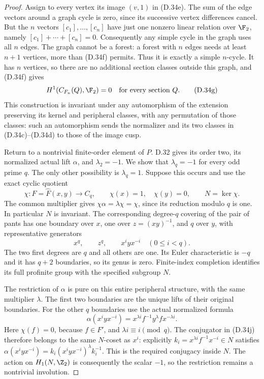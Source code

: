 \begin{proof}
Assign to every vertex its image $(v,1)$ in (D.34e).
The sum of the edge vectors around a graph cycle is zero,
since its successive vertex differences cancel.  But the
$n$ vectors $[c_1],\ldots,[c_n]$ have just one nonzero
linear relation over $\F_2$, namely
$[c_1]+\cdots+[c_n]=0$.  Consequently any simple cycle
in the graph uses all $n$ edges.  The graph cannot be a
forest: a forest with $n$ edges needs at least $n+1$
vertices, more than (D.34f) permits.  Thus it is exactly
a simple $n$-cycle.  It has $n$ vertices, so there are
no additional section classes outside this graph, and
(D.34f) gives
\[
            H^1(C_{F_n}(Q),\F_2)=0
                   \quad\text{for every section }Q.       \tag{D.34g}
\]
This construction is invariant under any automorphism
of the extension preserving its kernel and peripheral
classes, with any permutation of those classes: such
an automorphism sends the normalizer and its two classes
in (D.34c)--(D.34d) to those of the image cusp.

Return to a nontrivial finite-order element of $P$.
D.32 gives its order two, its normalized actual lift
$\alpha$, and $\lambda_2=-1$.  We show that
$\lambda_q=-1$ for every odd prime $q$.  The only other
possibility is $\lambda_q=1$.  Suppose this occurs and
use the exact cyclic quotient
\[
 \chi:F=\widehat F(x,y)\longrightarrow C_q,
          \qquad\chi(x)=1,\quad\chi(y)=0,
          \qquad N=\ker\chi.                            \tag{D.34h}
\]
The common multiplier gives
$\chi\alpha=\lambda\chi=\chi$, since its reduction
modulo $q$ is one.  In particular $N$ is invariant.
The corresponding degree-$q$ covering of the pair of
pants has one boundary over $x$, one over
$z=(xy)^{-1}$, and $q$ over $y$, with representative
generators
\[
 x^q,\qquad z^q,\qquad x^i yx^{-i}\quad(0\leq i<q).
                                                        \tag{D.34i}
\]
The two first degrees are $q$ and all others are one.
Its Euler characteristic is $-q$ and it has $q+2$
boundaries, so its genus is zero.  Finite-index
completion identifies its full profinite group with
the specified subgroup $N$.

The restriction of $\alpha$ is pure on this entire
peripheral structure, with the same multiplier
$\lambda$.  The first two boundaries are the unique
lifts of their original boundaries.  For the other
$q$ boundaries use the actual normalized formula
\[
 \alpha(x^i yx^{-i})
        =x^{\lambda i}f^{-1}y^\lambda f x^{-\lambda i}.
                                                        \tag{D.34j}
\]
Here $\chi(f)=0$, because $f\in F'$, and
$\lambda i\equiv i\pmod q$.  The conjugator in
(D.34j) therefore belongs to the same $N$-coset
as $x^i$: explicitly
$k_i=x^{\lambda i}f^{-1}x^{-i}\in N$ satisfies
$\alpha(x^i yx^{-i})=k_i(x^i yx^{-i})^\lambda k_i^{-1}$.
This is the required conjugacy inside $N$.  The action on
$H_1(N,\Z_2)$ is consequently the scalar $-1$,
so the restriction remains a nontrivial involution.


\end{proof}
